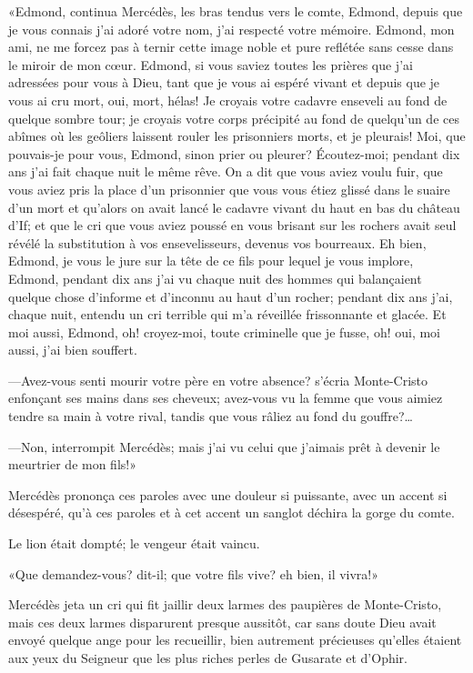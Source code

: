 «Edmond, continua Mercédès, les bras tendus vers le comte, Edmond, depuis que je vous connais j'ai adoré votre nom, j'ai respecté votre mémoire. Edmond, mon ami, ne me forcez pas à ternir cette image noble et pure reflétée sans cesse dans le miroir de mon cœur. Edmond, si vous saviez toutes les prières que j'ai adressées pour vous à Dieu, tant que je vous ai espéré vivant et depuis que je vous ai cru mort, oui, mort, hélas! Je croyais votre cadavre enseveli au fond de quelque sombre tour; je croyais votre corps précipité au fond de quelqu'un de ces abîmes où les geôliers laissent rouler les prisonniers morts, et je pleurais! Moi, que pouvais-je pour vous, Edmond, sinon prier ou pleurer? Écoutez-moi; pendant dix ans j'ai fait chaque nuit le même rêve. On a dit que vous aviez voulu fuir, que vous aviez pris la place d'un prisonnier que vous vous étiez glissé dans le suaire d'un mort et qu'alors on avait lancé le cadavre vivant du haut en bas du château d'If; et que le cri que vous aviez poussé en vous brisant sur les rochers avait seul révélé la substitution à vos ensevelisseurs, devenus vos bourreaux. Eh bien, Edmond, je vous le jure sur la tête de ce fils pour lequel je vous implore, Edmond, pendant dix ans j'ai vu chaque nuit des hommes qui balançaient quelque chose d'informe et d'inconnu au haut d'un rocher; pendant dix ans j'ai, chaque nuit, entendu un cri terrible qui m'a réveillée frissonnante et glacée. Et moi aussi, Edmond, oh! croyez-moi, toute criminelle que je fusse, oh! oui, moi aussi, j'ai bien souffert. 

—Avez-vous senti mourir votre père en votre absence? s'écria Monte-Cristo enfonçant ses mains dans ses cheveux; avez-vous vu la femme que vous aimiez tendre sa main à votre rival, tandis que vous râliez au fond du gouffre?\dots 

—Non, interrompit Mercédès; mais j'ai vu celui que j'aimais prêt à devenir le meurtrier de mon fils!» 

Mercédès prononça ces paroles avec une douleur si puissante, avec un accent si désespéré, qu'à ces paroles et à cet accent un sanglot déchira la gorge du comte. 

Le lion était dompté; le vengeur était vaincu. 

«Que demandez-vous? dit-il; que votre fils vive? eh bien, il vivra!» 

Mercédès jeta un cri qui fit jaillir deux larmes des paupières de Monte-Cristo, mais ces deux larmes disparurent presque aussitôt, car sans doute Dieu avait envoyé quelque ange pour les recueillir, bien autrement précieuses qu'elles étaient aux yeux du Seigneur que les plus riches perles de Gusarate et d'Ophir. 

